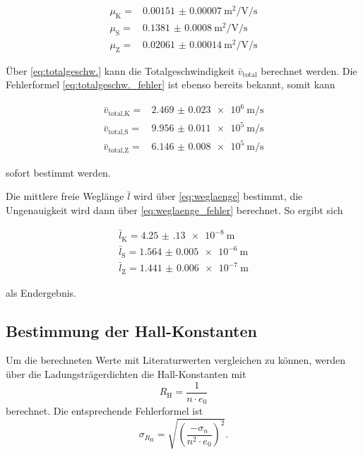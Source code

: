 \begin{align*}
    \mu _\text{K} =& \SI{0.00151(7)}{\meter\squared\per\volt\per\second}\\
    \mu _\text{S} =& \SI{0.1381(8)}{\meter\squared\per\volt\per\second}\\
    \mu _\text{Z} =& \SI{0.02061(14)}{\meter\squared\per\volt\per\second}
\end{align*}

Über \autoref{eq:totalgeschw.} kann die Totalgeschwindigkeit $\bar{v}_\text{total}$ berechnet werden.
Die Fehlerformel \autoref{eq:totalgeschw._fehler} ist ebenso bereits bekannt, somit kann 

\begin{align*}
    \bar{v}_\text{total,K} =& \SI{2.469(23)e6}{\meter\per\second}\\
    \bar{v}_\text{total,S} =& \SI{9.956(11)e5}{\meter\per\second}\\
    \bar{v}_\text{total,Z} =& \SI{6.146(8)e5}{\meter\per\second}
\end{align*}

sofort bestimmt werden.

Die mittlere freie Weglänge $\bar{l}$ wird über \autoref{eq:weglaenge} bestimmt, die Ungenauigkeit wird dann über \autoref{eq:weglaenge_fehler} berechnet.
So ergibt sich

\begin{align*}
    \bar{l}_\text{K} = \SI{4.25(13)e-8}{\meter}\\
    \bar{l}_\text{S} = \SI{1.564(5)e-6}{\meter}\\
    \bar{l}_\text{Z} = \SI{1.441(6)e-7}{\meter}
\end{align*}

als Endergebnis.

\subsection{Bestimmung der Hall-Konstanten}
\label{ssec:hallk}

Um die berechneten Werte mit Literaturwerten vergleichen zu können, werden über die Ladungsträgerdichten die Hall-Konstanten mit
\begin{equation}
    R_\text{H} = \frac{1}{n \cdot e_0}
\end{equation}
berechnet. Die entsprechende Fehlerformel ist
\begin{equation}
    \sigma_{R_\text{H}} = \sqrt{\left( \frac{-\sigma_n}{n^2 \cdot e_0} \right)^2}.
\end{equation}

